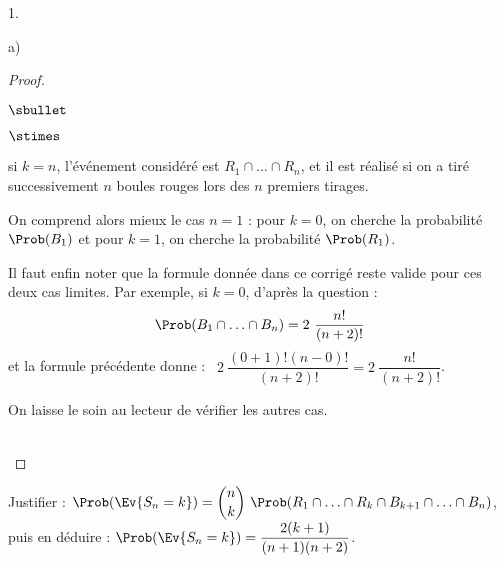 \begin{noliste}{1.}
\begin{noliste}{a)}
\begin{proof}
\begin{remark}
\begin{noliste}{$\sbullet$}
\begin{noliste}{$\stimes$}
          \item si $k = n$, l'événement considéré est $R_1 \cap \ldots
            \cap R_n$, et il est réalisé si on a tiré successivement
            $n$ boules rouges lors des $n$ premiers tirages.
          \end{noliste}

        \item On comprend alors mieux le cas $n = 1$ : pour $k = 0$,
          on cherche la probabilité $\Prob(B_1)$ et pour $k = 1$, on
          cherche la probabilité $\Prob(R_1)$.

        \item Il faut enfin noter que la formule donnée dans ce
          corrigé reste valide pour ces deux cas limites. Par exemple,
          si $k = 0$, d'après la question  :
          \[
          \Prob(B_1 \cap \ldots \cap B_n) = 2 \ \dfrac{n!}{(n+2)!}
          \]
          et la formule précédente donne : \ $2 \ \dfrac{(0+1)!
            (n-0)!}{(n+2)!} = 2 \ \dfrac{n!}{(n+2)!}$.

        \item On laisse le soin au lecteur de vérifier les autres cas.
        \end{noliste}
      \end{remark}~\\[-1.4cm]
    \end{proof}


    \newpage


  \item Justifier : $\Prob(\Ev{S_n = k}) = \dbinom{n}{k} \ \Prob(R_1
    \cap \ldots \cap R_k \cap B_{k+1} \cap \ldots \cap B_n)$,\\
    puis en déduire : $\Prob(\Ev{S_n = k}) =
    \dfrac{2(k+1)}{(n+1)(n+2)}$.


\end{noliste}
\end{noliste}
